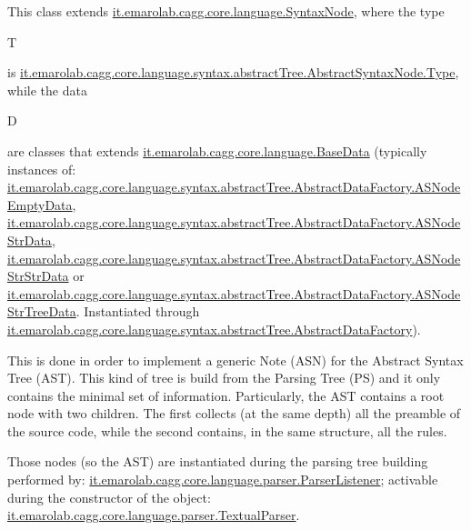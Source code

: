 This class extends \hyperlink{}{it.\-emarolab.\-cagg.\-core.\-language.\-Syntax\-Node}, where the type
\begin{DoxyCode}
T 
\end{DoxyCode}
 is \hyperlink{}{it.\-emarolab.\-cagg.\-core.\-language.\-syntax.\-abstract\-Tree.\-Abstract\-Syntax\-Node.\-Type}, while the data
\begin{DoxyCode}
D 
\end{DoxyCode}
 are classes that extends \hyperlink{}{it.\-emarolab.\-cagg.\-core.\-language.\-Base\-Data} (typically instances of\-: \hyperlink{classit_1_1emarolab_1_1cagg_1_1core_1_1language_1_1syntax_1_1abstractTree_1_1AbstractDataFactory_1_1ASNodeEmptyData}{it.\-emarolab.\-cagg.\-core.\-language.\-syntax.\-abstract\-Tree.\-Abstract\-Data\-Factory.\-A\-S\-Node\-Empty\-Data}, \hyperlink{classit_1_1emarolab_1_1cagg_1_1core_1_1language_1_1syntax_1_1abstractTree_1_1AbstractDataFactory_1_1ASNodeStrData}{it.\-emarolab.\-cagg.\-core.\-language.\-syntax.\-abstract\-Tree.\-Abstract\-Data\-Factory.\-A\-S\-Node\-Str\-Data}, \hyperlink{classit_1_1emarolab_1_1cagg_1_1core_1_1language_1_1syntax_1_1abstractTree_1_1AbstractDataFactory_1_1ASNodeStrStrData}{it.\-emarolab.\-cagg.\-core.\-language.\-syntax.\-abstract\-Tree.\-Abstract\-Data\-Factory.\-A\-S\-Node\-Str\-Str\-Data} or \hyperlink{classit_1_1emarolab_1_1cagg_1_1core_1_1language_1_1syntax_1_1abstractTree_1_1AbstractDataFactory_1_1ASNodeStrTreeData}{it.\-emarolab.\-cagg.\-core.\-language.\-syntax.\-abstract\-Tree.\-Abstract\-Data\-Factory.\-A\-S\-Node\-Str\-Tree\-Data}. Instantiated through \hyperlink{classit_1_1emarolab_1_1cagg_1_1core_1_1language_1_1syntax_1_1abstractTree_1_1AbstractDataFactory}{it.\-emarolab.\-cagg.\-core.\-language.\-syntax.\-abstract\-Tree.\-Abstract\-Data\-Factory}).\par


This is done in order to implement a generic Note (A\-S\-N) for the Abstract Syntax Tree (A\-S\-T). This kind of tree is build from the Parsing Tree (P\-S) and it only contains the minimal set of information. Particularly, the A\-S\-T contains a root node with two children. The first collects (at the same depth) all the preamble of the source code, while the second contains, in the same structure, all the rules.\par


Those nodes (so the A\-S\-T) are instantiated during the parsing tree building performed by\-: \hyperlink{classit_1_1emarolab_1_1cagg_1_1core_1_1language_1_1parser_1_1ParserListener}{it.\-emarolab.\-cagg.\-core.\-language.\-parser.\-Parser\-Listener}; activable during the constructor of the object\-: \hyperlink{classit_1_1emarolab_1_1cagg_1_1core_1_1language_1_1parser_1_1TextualParser}{it.\-emarolab.\-cagg.\-core.\-language.\-parser.\-Textual\-Parser}.\par


